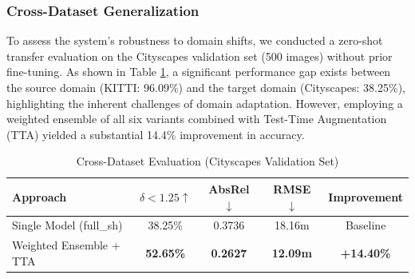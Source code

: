 \documentclass{article}
\begin{document}
\begin{table}[H]
    \centering
    \caption{RT-MonoDepth Performance on KITTI Eigen Split (7,514 test images).}
    \label{tab:monodepth}
\end{table}

\subsubsection{Cross-Dataset Generalization}
To assess the system's robustness to domain shifts, we conducted a zero-shot transfer evaluation on the Cityscapes validation set (500 images) without prior fine-tuning. As shown in Table \ref{tab:cityscapes}, a significant performance gap exists between the source domain (KITTI: 96.09\%) and the target domain (Cityscapes: 38.25\%), highlighting the inherent challenges of domain adaptation. However, employing a weighted ensemble of all six variants combined with Test-Time Augmentation (TTA) yielded a substantial 14.4\% improvement in accuracy.

\begin{table}[H]
    \centering
    \caption{Cross-Dataset Evaluation (Cityscapes Validation Set)}
    \label{tab:cityscapes}
    \begin{tabular}{lcccc}
    \toprule
    \textbf{Approach} & $\delta < 1.25 \uparrow$ & AbsRel $\downarrow$ & RMSE $\downarrow$ & Improvement \\
    \midrule
    Single Model (full\_sh) & 38.25\% & 0.3736 & 18.16m & Baseline \\
    Weighted Ensemble + TTA & \textbf{52.65\%} & \textbf{0.2627} & \textbf{12.09m} & \textbf{+14.40\%} \\
    \bottomrule
    \end{tabular}
\end{table}
\end{document}
